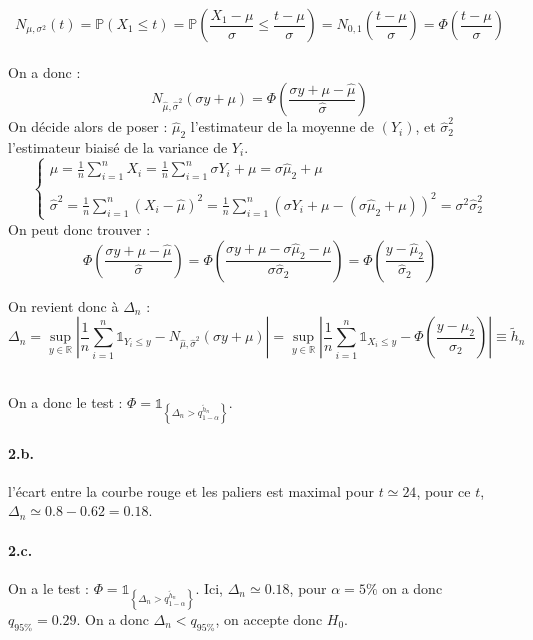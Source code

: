 \documentclass[a4paper,10pt]{report}
\newcommand{\proba}[1]{\mathbb{P} \left(#1\right)} %
\begin{document}
$$
N_{\mu, \sigma^2}(t) = \proba{X_1 \leq t} = \proba{\frac{X_1 - \mu}{\sigma} \leq \frac{t - \mu}{\sigma} } = N_{0,1}\left(\frac{t-\mu}{\sigma}\right) = \Phi\left(\frac{t-\mu}{\sigma}\right)
$$\\
\newline
On a donc :
$$
N_{\hat{\mu}, \hat{\sigma}^2}(\sigma y + \mu) = \Phi \left(  \frac{\sigma y + \mu - \hat{\mu}}{\hat{\sigma}} \right)
$$
On décide alors de poser : $\hat{\mu}_2 $ l'estimateur de la moyenne de $(Y_i)$, et $\hat{\sigma}_2^2 $ l'estimateur biaisé de la variance de $Y_i$.
$$
\left\{
\begin{array}{l}
\hat{\mu} = \frac{1}{n} \sum_{i=1}^n X_i = \frac{1}{n} \sum_{i=1}^n \sigma Y_i + \mu = \sigma \hat{\mu}_2 + \mu  \\
\\
\hat{\sigma}^2 = \frac{1}{n} \sum_{i=1}^n (X_i - \hat{\mu})^2 = \frac{1}{n} \sum_{i=1}^n (  \sigma Y_i + \mu - ( \sigma  \hat{\mu}_2 + \mu )   )^2 = \sigma^2 \hat{\sigma}_2^2
\end{array}
\right.
$$
On peut donc trouver :
$$
\Phi \left(  \frac{\sigma y + \mu - \hat{\mu}}{\hat{\sigma}} \right) = \Phi \left(  \frac{\sigma y + \mu -  \sigma \hat{\mu}_2 - \mu}{\sigma \hat{\sigma}_2} \right) = \Phi \left(  \frac{y - \hat{\mu}_2}{\hat{\sigma}_2} \right)
$$

On revient donc à $\Delta_n$ :
$$
\Delta_n = \sup_{y \in \mathbb{R}} \left|  \frac{1}{n} \sum_{i=1}^n \mathds{1}_{Y_i \leq y}   - N_{\hat{\mu}, \hat{\sigma}^2}(\sigma y + \mu)\right| = \sup_{y \in \mathbb{R}} \left|    \frac{1}{n} \sum_{i=1}^n \mathds{1}_{X_i \leq y}   -  \Phi \left(  \frac{y - \hat{\mu}_2}{\hat{\sigma}_2} \right) \right| \equiv \tilde{h}_n
$$\\
\newline

On a donc le test : $\Phi = \mathds{1}_{ \left\{  \Delta_n > q_{1-\alpha}^{\tilde{h}_n}   \right\}    }$.


\paragraph{2.b.} l'écart entre la courbe rouge et les paliers est maximal pour $t \simeq 24$, pour ce $t$, $\Delta_n \simeq 0.8 - 0.62 = 0.18$.


\paragraph{2.c.} On a le test : $\Phi = \mathds{1}_{ \left\{  \Delta_n > q_{1-\alpha}^{\tilde{h}_n}   \right\}    }$. Ici, $\Delta_n \simeq 0.18$, pour $\alpha = 5\%$ on a donc $q_{95\%} = 0.29 $. On a donc $\Delta_n < q_{95\%}$, on accepte donc $H_0$.
\end{document}
